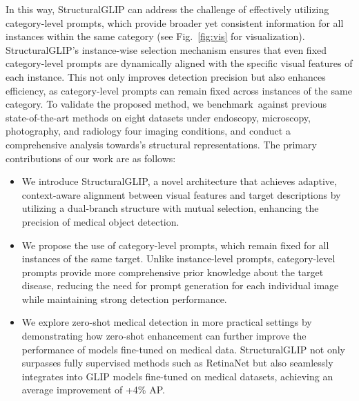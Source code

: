 In this way, StructuralGLIP can address the challenge of effectively utilizing category-level prompts, which provide broader yet consistent information for all instances within the same category (see Fig.~\ref{fig:vis} for visualization). StructuralGLIP’s instance-wise selection mechanism ensures that even fixed category-level prompts are dynamically aligned with the specific visual features of each instance. This not only improves detection precision but also enhances efficiency, as category-level prompts can remain fixed across instances of the same category.
To validate the proposed method, we benchmark\ours~against previous state-of-the-art methods on eight datasets under endoscopy, microscopy, photography, and radiology four imaging conditions, and conduct a comprehensive analysis towards\ours's structural representations. 
The primary contributions of our work are as follows:
\begin{itemize}[leftmargin=14pt, itemsep = -2pt, topsep = 0pt] 
\item We introduce StructuralGLIP, a novel architecture that achieves adaptive, context-aware alignment between visual features and target descriptions by utilizing a dual-branch structure with mutual selection, enhancing the precision of medical object detection. 
\item We propose the use of category-level prompts, which remain fixed for all instances of the same target. Unlike instance-level prompts, category-level prompts provide more comprehensive prior knowledge about the target disease, reducing the need for prompt generation for each individual image while maintaining strong detection performance. 
\item We explore zero-shot medical detection in more practical settings by demonstrating how zero-shot enhancement can further improve the performance of models fine-tuned on medical data. StructuralGLIP not only surpasses fully supervised methods such as RetinaNet but also seamlessly integrates into GLIP models fine-tuned on medical datasets, achieving an average improvement of +4\% AP.
\end{itemize}

